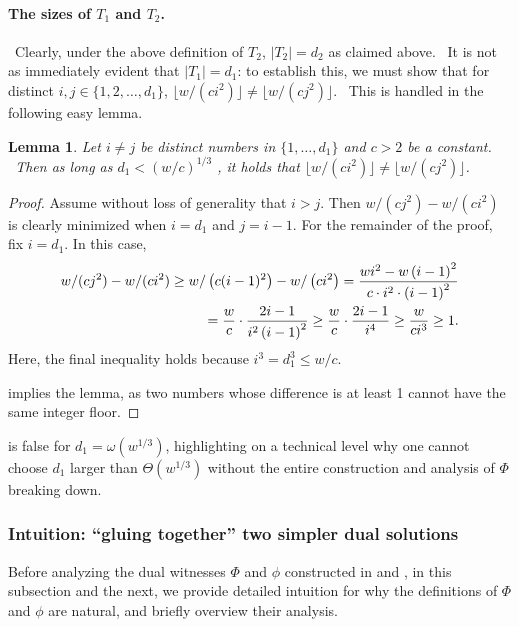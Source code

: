 \documentclass[10pt,a4paper]{article}
\newtheorem{lemma}[theorem]{Lemma}
\newcommand{\<}{\langle}
\renewcommand{\>}{\rangle}
\newcommand{\para}[1]{\paragraph{#1}}
\begin{document}
\para{The sizes of $T_{1}$ and $T_{2}$.} \ Clearly,
under the above definition of $T_{2}$, $|T_{2}|=d_{2}$ as claimed above. \
It is not as immediately evident that $|T_{1}|=d_{1}$: to establish this, we
must show that for distinct $i,j\in \{1,2,\dots ,d_{1}\}$, $\lfloor
w/(ci^{2})\rfloor \neq \lfloor w/(cj^{2})\rfloor $. \ This is handled in the
following easy lemma.

\begin{lemma}
\label{lem:distinct} Let $i\neq j$ be distinct numbers in $\{1,\dots ,d_{1}\}
$ and $c>2$ be a constant. \ Then as long as $d_{1}<\left( w/c\right) ^{1/3}$
, it holds that $\lfloor w/(ci^{2})\rfloor \neq \lfloor w/(cj^{2})\rfloor $.
\end{lemma}

\begin{proof}
Assume without loss of generality that  $i> j$. Then $w/(c j^2)- w/(c i^2)$ is clearly minimized when $i=d_1$ and $j=i-1$.
For the remainder of the proof, fix $i=d_1$.
In this case,
\begin{align}
w/(c j^2) - w/(c i^2) \geq
w/\left(c (i-1)^2\right) - w/\left(c i^2\right)
= \frac{w i^2 - w \left(i-1\right)^2}{c \cdot i^2 \cdot \left(i-1\right)^2} \notag \\
= \frac{w}{c} \cdot \frac{2i-1}{i^2\left(i-1\right)^2 }
\geq \frac{w}{c} \cdot \frac{2i-1}{i^4}
\geq \frac{w}{c i^3} \geq 1. \label{eq28}
\end{align}
Here, the final inequality holds because $i^3 = d_1^3 \leq w/c$.

 implies the lemma, as two numbers whose difference is at least 1 cannot have
the same integer floor.
\end{proof}

 is false for $d_1 = \omega(w^{1/3})$, highlighting on a
technical level why one cannot choose $d_1$ larger than $\Theta(w^{1/3})$
without the entire construction and analysis of $\Phi$ breaking down.

\subsubsection{Intuition: ``gluing together'' two simpler dual solutions}

Before analyzing the dual witnesses
$\Phi$ and $\phi$ constructed in  and ,
in this subsection and the next, we provide detailed intuition
for why the definitions of $\Phi$ and $\phi$ are natural,
and briefly overview their analysis. 
\end{document}
